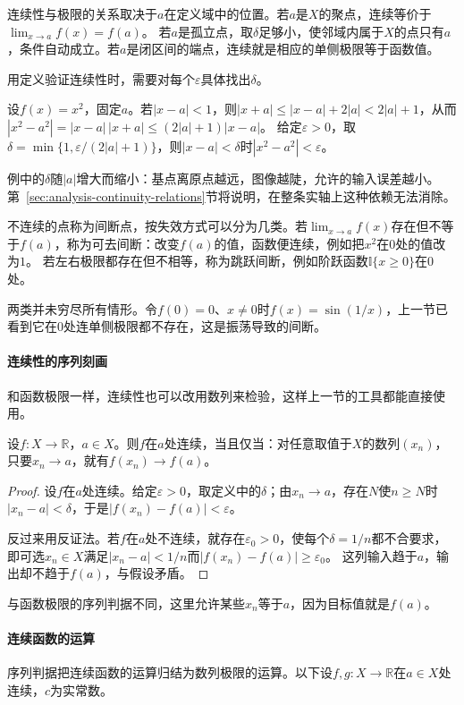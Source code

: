 连续性与极限的关系取决于$a$在定义域中的位置。若$a$是$X$的聚点，连续等价于$\lim_{x\to a}f(x)=f(a)$。
若$a$是孤立点，取$\delta$足够小，使邻域内属于$X$的点只有$a$，条件自动成立。若$a$是闭区间的端点，连续就是相应的单侧极限等于函数值。

用定义验证连续性时，需要对每个$\varepsilon$具体找出$\delta$。
\begin{example}[平方函数在每一点连续]
\label{ex:analysis-square-pointwise-continuity}
设$f(x)=x^2$，固定$a$。若$|x-a|<1$，则$|x+a|\leq|x-a|+2|a|<2|a|+1$，从而$|x^2-a^2|=|x-a|\,|x+a|\leq(2|a|+1)|x-a|$。
给定$\varepsilon>0$，取$\delta=\min\{1,\varepsilon/(2|a|+1)\}$，则$|x-a|<\delta$时$|x^2-a^2|<\varepsilon$。
\end{example}
例中的$\delta$随$|a|$增大而缩小：基点离原点越远，图像越陡，允许的输入误差越小。第~\ref{sec:analysis-continuity-relations}节将说明，在整条实轴上这种依赖无法消除。

不连续的点称为间断点，按失效方式可以分为几类。若$\lim_{x\to a}f(x)$存在但不等于$f(a)$，称为可去间断：改变$f(a)$的值，函数便连续，例如把$x^2$在$0$处的值改为$1$。
若左右极限都存在但不相等，称为跳跃间断，例如阶跃函数$\mathbb I\{x\geq0\}$在$0$处。

两类并未穷尽所有情形。令$f(0)=0$、$x\neq0$时$f(x)=\sin(1/x)$，上一节已看到它在$0$处连单侧极限都不存在，这是振荡导致的间断。

\paragraph{连续性的序列刻画}
和函数极限一样，连续性也可以改用数列来检验，这样上一节的工具都能直接使用。
\begin{theorem}[连续性的序列判据]
\label{thm:ru-continuity-sequential}
设$f:X\to\mathbb R$，$a\in X$。则$f$在$a$处连续，当且仅当：对任意取值于$X$的数列$(x_n)$，只要$x_n\to a$，就有$f(x_n)\to f(a)$。
\end{theorem}
\begin{proof}
设$f$在$a$处连续。给定$\varepsilon>0$，取定义中的$\delta$；由$x_n\to a$，存在$N$使$n\geq N$时$|x_n-a|<\delta$，于是$|f(x_n)-f(a)|<\varepsilon$。

反过来用反证法。若$f$在$a$处不连续，就存在$\varepsilon_0>0$，使每个$\delta=1/n$都不合要求，即可选$x_n\in X$满足$|x_n-a|<1/n$而$|f(x_n)-f(a)|\geq\varepsilon_0$。
这列输入趋于$a$，输出却不趋于$f(a)$，与假设矛盾。
\end{proof}
与函数极限的序列判据不同，这里允许某些$x_n$等于$a$，因为目标值就是$f(a)$。

\paragraph{连续函数的运算}
序列判据把连续函数的运算归结为数列极限的运算。以下设$f,g:X\to\mathbb R$在$a\in X$处连续，$c$为实常数。

